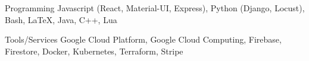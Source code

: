 



\begin{cvskills}

  \cvskill
    {Programming} %
    {Javascript (React, Material-UI, Express), Python (Django, Locust), Bash, \LaTeX, Java, C++, Lua} %

  \cvskill
    {Tools/Services} %
    {Google Cloud Platform, Google Cloud Computing, Firebase, Firestore, Docker, Kubernetes, Terraform, Stripe} %

\end{cvskills}


% 
% 
% 
% 
% 
% 
